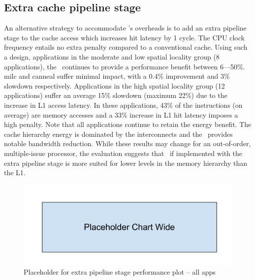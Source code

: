 {{\subsection{Extra cache pipeline stage}
\label{sec:extra_cache_pipeline_stage}

An alternative strategy to accommodate \AC{}'s overheads is to add an extra pipeline stage to the cache access which increases hit latency by 1 cycle. The CPU clock frequency entails no extra penalty compared to a conventional cache. Using such a design, applications in the moderate and low spatial locality group (8 applications), the \AC\ continues to provide a performance benefit between 6---50\%. milc and canneal suffer minimal impact, with a 0.4\% improvement and 3\% slowdown respectively.  Applications in the high spatial locality group (12 applications) suffer an average 15\% slowdown (maximum 22\%) due to the increase in L1 access latency. In these applications, 43\% of the instructions (on average) are memory accesses and a 33\% increase in L1 hit latency imposes a high penalty. Note that all applications continue to retain the energy benefit. The cache hierarchy energy is dominated by the interconnects and the \AC\ provides notable bandwidth reduction. While these results may change for an out-of-order, multiple-issue processor, the evaluation suggests that \AC\ if implemented with the extra pipeline stage is more suited for lower levels in the memory hierarchy than the L1.  

\begin{figure}[h]
  \centering
  \includegraphics[width=\textwidth]{files/Figures/Placeholder_Chart_Wide.pdf}
  \caption{Placeholder for extra pipeline stage performance plot -- all apps}
  \label{fig:extra_cache_pipeline_stage}
\end{figure}

}}
